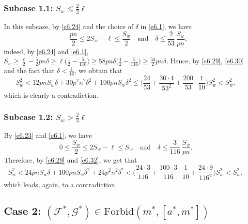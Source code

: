 \documentclass[10pt,a4paper]{amsart}
\theoremstyle{remark}
\newcommand{\meg}{\geqslant}
\newcommand{\mik}{\leqslant}
\newcommand{\Fcal}{\mathcal{F}}
\newcommand{\Gcal}{\mathcal{G}}
\begin{document}
\subsubsection*{Subcase 1.1: $S_w\mik \frac23\ell$} In this subcase, by \eqref{e6.24} and the choice of
$\delta$ in \eqref{e6.1}, we have
\begin{equation} \label{e6.30}
-\frac{pn}{2}\mik 2S_w-\ell \mik \frac{S_w}{2} \ \ \ \text{ and } \ \ \
\delta \mik\frac{2}{53}\, \frac{S_w}{pn};
\end{equation}
indeed, by \eqref{e6.24} and \eqref{e6.1}, $S_w\meg \frac{\ell}{2}-\frac52 pn\delta\meg
\ell \big(\frac12- \frac{5}{116}\big) \meg 58pn\delta \big(\frac12- \frac{5}{116}\big)\meg
\frac{53}{2}pn\delta$. Hence, by \eqref{e6.29}, \eqref{e6.30} and the fact that $\delta<\frac{1}{10}$, we obtain that
\begin{equation} \label{e6.31}
S_w^2 < 12pnS_w\delta +30p^2n^2\delta^2 + 100pnS_w\delta^2
\mik \Big( \frac{24}{53}+ \frac{30\cdot 4}{53^2}+ \frac{200}{53}\cdot\frac{1}{10} \Big) S_w^2 < S_w^2,
\end{equation}
which is clearly a contradiction.

\subsubsection*{Subcase 1.2: $S_w>\frac23\ell$} By \eqref{e6.23} and \eqref{e6.1}, we have
\begin{equation} \label{e6.32}
0\mik \frac{S_w}{2} \mik 2S_w-\ell \mik S_w \ \ \ \text{ and } \ \ \
\delta \mik\frac{3}{116}\, \frac{S_w}{pn}.
\end{equation}
Therefore, by \eqref{e6.29} and \eqref{e6.32}, we get that
\begin{equation} \label{e6.33}
S_w^2 < 24pnS_w\delta +100pn S_w\delta^2 + 24 p^2n^2\delta^2
< \Big( \frac{24\cdot 3}{116}+ \frac{100\cdot 3}{116}\cdot \frac{1}{10}+ \frac{24\cdot 9}{116^2} \Big) S_w^2 < S_w^2,
\end{equation}
which leads, again, to a contradiction.

\subsection*{Case 2: $(\Fcal^*,\Gcal^*)\in\mathrm{Forbid}(m^*,[a^*,m^*])$}
\end{document}
